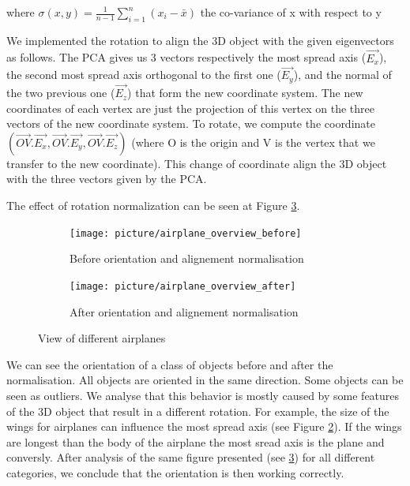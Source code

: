 \documentclass[10pt,twocolumn,letterpaper]{article}
\begin{document}
where $ \sigma(x,y) = \frac{1}{n-1} \sum\limits_{i=1}^n ( x_i - \bar{x} ) $ the co-variance of x with respect to y
	
	We implemented the rotation to align the 3D object with the given eigenvectors as follows. The PCA gives us 3 vectors respectively the most spread axis ($\overrightarrow{E_x}$), the second most spread axis orthogonal to the first one ($\overrightarrow{E_y}$), and the normal of the two previous one ($\overrightarrow{E_z}$) that form the new coordinate system. The new coordinates of each vertex are just the projection of this vertex on the three vectors of the new coordinate system. To rotate, we compute the coordinate $(\overrightarrow{OV}.\overrightarrow{E_x}, \overrightarrow{OV}.\overrightarrow{E_y}, \overrightarrow{OV}.\overrightarrow{E_z})$ (where O is the origin and V is the vertex that we transfer to the new coordinate). This change of coordinate align the 3D object with the three vectors given by the PCA.
	
	The effect of rotation normalization can be seen at Figure \ref{fig:PCA-alignement}.

\begin{figure}
\centering
\begin{subfigure}{.5\textwidth}
  \centering
  \texttt{[image: picture/airplane\_overview\_before]}
  \caption{Before orientation and alignement normalisation}
  \label{fig:overview_before}
\end{subfigure}%
\begin{subfigure}{.5\textwidth}
  \centering
  \texttt{[image: picture/airplane\_overview\_after]}
  \caption{After orientation and alignement normalisation}
  \label{fig:overview_after}
\end{subfigure}
\caption{View of different airplanes}
\label{fig:PCA-alignement}
\end{figure}
	
	We can see the orientation of a class of objects before and after the normalisation. All objects are oriented in the same direction. Some objects can be seen as outliers. We analyse that this behavior is mostly caused by some features of the 3D object that result in a different rotation. For example, the size of the wings for airplanes can influence the most spread axis (see Figure \ref{fig:overview_after}). If the wings are longest than the body of the airplane the most sread axis is the plane and conversly. After analysis of the same figure presented (see \ref{fig:PCA-alignement}) for all different categories, we conclude that the orientation is then working correctly.
	
\end{document}
